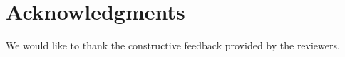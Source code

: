 \documentclass{aims}
\numberwithin{equation}{section}
\begin{document}
\section*{Acknowledgments}
We would like to thank the constructive feedback provided by the reviewers.



\end{document}

